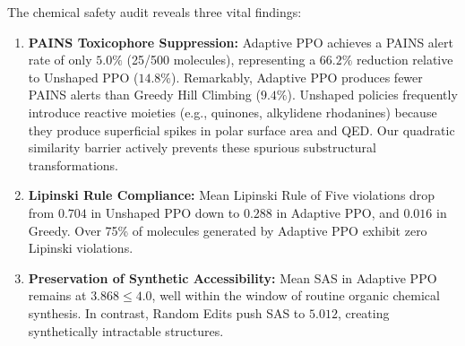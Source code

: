 \documentclass{ieeeaccess}
\begin{document}
The chemical safety audit reveals three vital findings:
\begin{enumerate}
    \item \textbf{PAINS Toxicophore Suppression:} Adaptive PPO achieves a PAINS alert rate of only $\mathbf{5.0\%}$ (25/500 molecules), representing a $\mathbf{66.2\%}$ reduction relative to Unshaped PPO ($14.8\%$). Remarkably, Adaptive PPO produces fewer PAINS alerts than Greedy Hill Climbing ($9.4\%$). Unshaped policies frequently introduce reactive moieties (e.g., quinones, alkylidene rhodanines) because they produce superficial spikes in polar surface area and QED. Our quadratic similarity barrier actively prevents these spurious substructural transformations.
    \item \textbf{Lipinski Rule Compliance:} Mean Lipinski Rule of Five violations drop from $0.704$ in Unshaped PPO down to $\mathbf{0.288}$ in Adaptive PPO, and $\mathbf{0.016}$ in Greedy. Over 75\% of molecules generated by Adaptive PPO exhibit zero Lipinski violations.
    \item \textbf{Preservation of Synthetic Accessibility:} Mean SAS in Adaptive PPO remains at $\mathbf{3.868 \le 4.0}$, well within the window of routine organic chemical synthesis. In contrast, Random Edits push SAS to $5.012$, creating synthetically intractable structures.
\end{enumerate}
\end{document}

